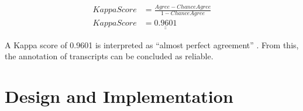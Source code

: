 \documentclass[hidelinks, 11pt]{article}
\begin{document}








\begin{equation}
  \begin{split}
    KappaScore & = \frac{Agree - ChanceAgree}{1 - ChanceAgree} \\
    KappaScore & = \underline{\underline{0.9601}}
  \end{split}
\end{equation}

\noindent
A Kappa score of 0.9601 is interpreted as ``almost perfect agreement'' \cite{McHugh_2012}. From this, the annotation of transcripts can be concluded as reliable.

\section{Design and Implementation}
\label{sec:implementation}
\end{document}
